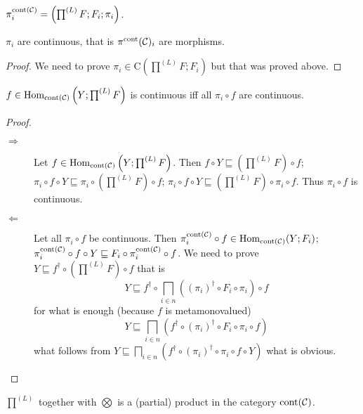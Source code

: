\begin{defn}
  $\pi^{\operatorname{cont} (\mathcal{C})}_i = \left( \prod^{(L)} F ; F_i ;
  \pi_i \right)$.
\end{defn}

\begin{prop}
  $\pi_i$ are continuous, that is $\pi^{\operatorname{cont}}
  (\mathcal{C})_i$ are morphisms.
\end{prop}

\begin{proof}
  We need to prove $\pi_i \in \mathrm{C} \left( \prod^{(L)} F ; F_i \right)$
  but that was proved above.
\end{proof}

\begin{lem}
  $f \in \operatorname{Hom}_{\operatorname{cont} (\mathcal{C})} \left( Y ;
  \prod^{(L)} F \right)$ is continuous iff all $\pi_i \circ f$ are continuous.
\end{lem}

\begin{proof}
  ~
  \begin{description}
    \item[$\Rightarrow$] Let $f \in \operatorname{Hom}_{\operatorname{cont}
    (\mathcal{C})} \left( Y ; \prod^{(L)} F \right)$. Then $f \circ Y
    \sqsubseteq \left( \prod^{(L)} F \right) \circ f$; $\pi_i \circ f \circ Y
    \sqsubseteq \pi_i \circ \left( \prod^{(L)} F \right) \circ f$; $\pi_i
    \circ f \circ Y \sqsubseteq \left( \prod^{(L)} F \right) \circ \pi_i \circ
    f$. Thus $\pi_i \circ f$ is continuous.
    
    \item[$\Leftarrow$] Let all $\pi_i \circ f$ be continuous. Then
    $\pi^{\operatorname{cont} (\mathcal{C})}_i \circ f \in
    \operatorname{Hom}_{\operatorname{cont} (\mathcal{C})} (Y ; F_i)$;
    $\pi^{\operatorname{cont} (\mathcal{C})}_i \circ f \circ Y \sqsubseteq
    F_i \circ \pi^{\operatorname{cont} (\mathcal{C})}_i \circ f$. We need
    to prove $Y \sqsubseteq f^{\dagger} \circ \left( \prod^{(L)} F \right)
    \circ f$ that is
    \[ Y \sqsubseteq f^{\dagger} \circ \bigsqcap_{i \in n} ((\pi_i)^{\dagger}
       \circ F_i \circ \pi_i) \circ f \]
    for what is enough (because $f$ is metamonovalued)
    \[ Y \sqsubseteq \bigsqcap_{i \in n} (f^{\dagger} \circ (\pi_i)^{\dagger}
       \circ F_i \circ \pi_i \circ f) \]
    what follows from $Y \sqsubseteq \bigsqcap_{i \in n} (f^{\dagger} \circ
    (\pi_i)^{\dagger} \circ \pi_i \circ f \circ Y)$ what is obvious.
  \end{description}
\end{proof}

\begin{thm}
  $\prod^{(L)}$ together with $\bigotimes$ is a (partial) product in the
  category $\operatorname{cont} (\mathcal{C})$.
\end{thm}

